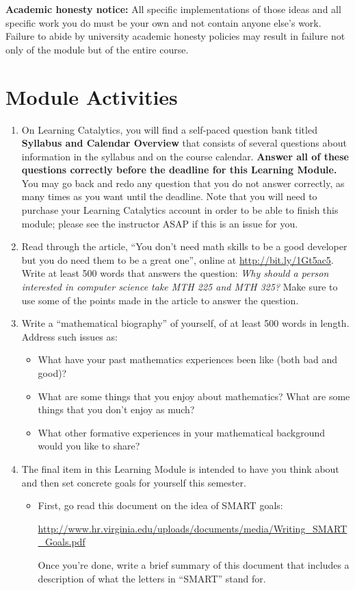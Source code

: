 \documentclass[11pt,letterpaper]{article}
\begin{document}
\smallskip

\textbf{Academic honesty notice:} All specific implementations of those ideas and all specific work you do must be your own and not contain anyone else's work. Failure to abide by university academic honesty policies may result in failure not only of the module but of the entire course. 

\section*{Module Activities}

\begin{enumerate}
	\item On Learning Catalytics, you will find a self-paced question bank titled \textbf{Syllabus and Calendar Overview} that consists of several questions about information in the syllabus and on the course calendar. \textbf{Answer all of these questions correctly before the deadline for this Learning Module.} You may go back and redo any question that you do not answer correctly, as many times as you want until the deadline. Note that you will need to purchase your Learning Catalytics account in order to be able to finish this module; please see the instructor ASAP if this is an issue for you. 


	\item Read through the article, ``You don't need math skills to be a good developer but you do need them to be a great one'', online at \url{http://bit.ly/1Gt5ac5}. Write at least 500 words that answers the question: \emph{Why should a person interested in computer science take MTH 225 and MTH 325?} Make sure to use some of the points made in the article to answer the question. 

	\item Write a ``mathematical biography'' of yourself, of at least 500 words in length. Address such issues as: 
		\begin{itemize}
		 	\item What have your past mathematics experiences been like (both bad and good)? 
		 	\item What are some things that you enjoy about mathematics? What are some things that you don't enjoy as much? 
		 	\item What other formative experiences in your mathematical background would you like to share? 
		 \end{itemize} 

	\item The final item in this Learning Module is intended to have you think about and then set concrete goals for yourself this semester. 
		\begin{itemize}
			\item First, go read this document on the idea of SMART goals: 
			\begin{center}
				\url{http://www.hr.virginia.edu/uploads/documents/media/Writing_SMART_Goals.pdf}
			\end{center}
			Once you're done, write a brief summary of this document that includes a description of what the letters in ``SMART'' stand for. 


\end{itemize}
\end{enumerate}
\end{document}
